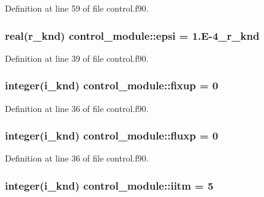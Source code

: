 Definition at line 59 of file control.\-f90.

\hypertarget{classcontrol__module_af1c813926ca0adb64361e5b48a4f73b9}{
\subsubsection[{epsi}]{\setlength{\rightskip}{0pt plus 5cm}real(r\-\_\-knd) control\-\_\-module\-::epsi = 1.\-E-\/4\-\_\-r\-\_\-knd}}\label{classcontrol__module_af1c813926ca0adb64361e5b48a4f73b9}


Definition at line 39 of file control.\-f90.

\hypertarget{classcontrol__module_ad305163b99235b021c5cf0f91e69c6d5}{
\subsubsection[{fixup}]{\setlength{\rightskip}{0pt plus 5cm}integer(i\-\_\-knd) control\-\_\-module\-::fixup = 0}}\label{classcontrol__module_ad305163b99235b021c5cf0f91e69c6d5}


Definition at line 36 of file control.\-f90.

\hypertarget{classcontrol__module_afb6375328be86057f0ac0af554c9abac}{
\subsubsection[{fluxp}]{\setlength{\rightskip}{0pt plus 5cm}integer(i\-\_\-knd) control\-\_\-module\-::fluxp = 0}}\label{classcontrol__module_afb6375328be86057f0ac0af554c9abac}


Definition at line 36 of file control.\-f90.

\hypertarget{classcontrol__module_a668776c82e56b5c08c95f01915287eb2}{
\subsubsection[{iitm}]{\setlength{\rightskip}{0pt plus 5cm}integer(i\-\_\-knd) control\-\_\-module\-::iitm = 5}}\label{classcontrol__module_a668776c82e56b5c08c95f01915287eb2}

